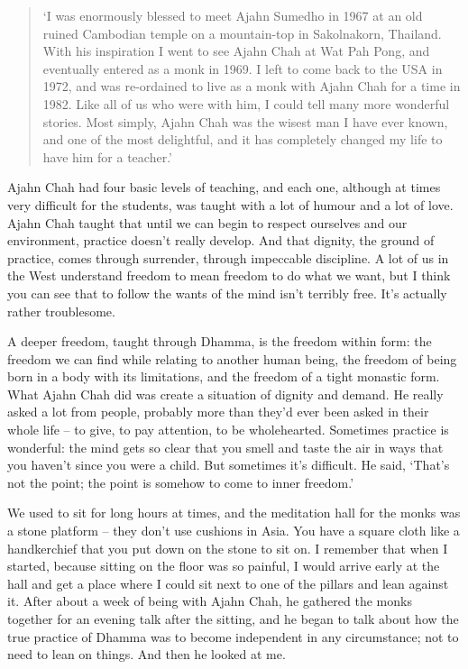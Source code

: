 
\begin{quote}
`I was enormously blessed to meet Ajahn Sumedho in 1967 at
an old ruined Cambodian temple on a mountain-top in Sakolnakorn, 
Thailand. With his inspiration I went to see Ajahn Chah at Wat Pah Pong, 
and eventually entered as a monk in 1969. I left to come back to the USA
in 1972, and was re-ordained to live as a monk with Ajahn Chah for a
time in 1982. Like all of us who were with him, I could tell many more
wonderful stories. Most simply, Ajahn Chah was the wisest man I have ever known, and one of
the most delightful, and it has completely
changed my life to have him for a teacher.'
\end{quote}

\noindent
Ajahn Chah had four basic levels of teaching, and each one, although at
times very difficult for the students, was taught with a lot of humour
and a lot of love. Ajahn Chah taught that until we can begin to respect
ourselves and our environment, practice doesn't really develop. And that
dignity, the ground of practice, comes through surrender, through
impeccable discipline. A lot of us in the West understand freedom to
mean freedom to do what we want, but I think you can see that to follow
the wants of the mind isn't terribly free. It's actually rather
troublesome. 

A deeper freedom, taught through Dhamma, is the freedom within form: the
freedom we can find while relating to another human being, the freedom
of being born in a body with its limitations, and the freedom of a tight
monastic form. What Ajahn Chah did was create a situation of dignity and
demand. He really asked a lot from people, probably more than they'd
ever been asked in their whole life -- to give, to pay attention, to be
wholehearted. Sometimes practice is wonderful: the mind gets so clear
that you smell and taste the air in ways that you haven't since
you were a child. But sometimes it's difficult. He said, `That's not the
point; the point is somehow to come to inner freedom.'

We used to sit for long hours at times, and the meditation hall for the
monks was a stone platform -- they don't use cushions in Asia. You have a
square cloth like a handkerchief that you put down on the stone to sit
on. I remember that when I started, because sitting on the floor was so
painful, I would arrive early at the hall and get a place where I could
sit next to one of the pillars and lean against it. After about a week
of being with Ajahn Chah, he gathered the monks together for an evening
talk after the sitting, and he began to talk about how the true practice
of Dhamma was to become independent in any circumstance; not to need to
lean on things. And then he looked at me. 

